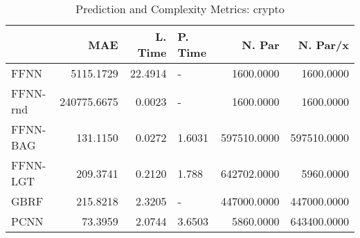 \begin{table}
\centering
\caption{Prediction and Complexity Metrics: crypto}
\label{tab__crypto__Fix_Neurons_QTrue}
\begin{tabular}{lrrlrr}
\toprule
{} &         MAE &  L. Time & P. Time &      N. Par &    N. Par/x \\
\midrule
FFNN     &   5115.1729 &  22.4914 &       - &   1600.0000 &   1600.0000 \\
FFNN-rnd & 240775.6675 &   0.0023 &       - &   1600.0000 &   1600.0000 \\
FFNN-BAG &    131.1150 &   0.0272 &  1.6031 & 597510.0000 & 597510.0000 \\
FFNN-LGT &    209.3741 &   0.2120 &   1.788 & 642702.0000 &   5960.0000 \\
GBRF     &    215.8218 &   2.3205 &       - & 447000.0000 & 447000.0000 \\
PCNN     &     73.3959 &   2.0744 &  3.6503 &   5860.0000 & 643400.0000 \\
\bottomrule
\end{tabular}
\end{table}
